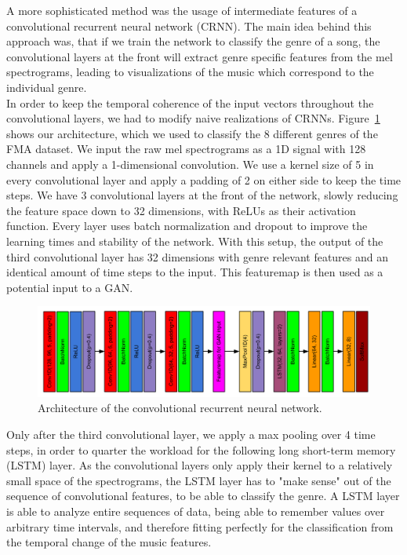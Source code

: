     A more sophisticated method was the usage of intermediate features of a convolutional recurrent neural network (CRNN).
    The main idea behind this approach was, that if we train the network to classify the genre of a song, the convolutional layers at the front will extract genre specific features from the mel spectrograms, leading to visualizations of the music which correspond to the individual genre.\\
    In order to keep the temporal coherence of the input vectors throughout the convolutional layers, we had to modify naive realizations of CRNNs.
    Figure~\ref{CRNN} shows our architecture, which we used to classify the 8 different genres of the FMA dataset.
    We input the raw mel spectrograms as a 1D signal with 128 channels and apply a 1-dimensional convolution. 
    We use a kernel size of 5 in every convolutional layer and apply a padding of 2 on either side to keep the time steps.
    We have 3 convolutional layers at the front of the network, slowly reducing the feature space down to 32 dimensions, with ReLUs as their activation function.
    Every layer uses batch normalization and dropout to improve the learning times and stability of the network.
    With this setup, the output of the third convolutional layer has 32 dimensions with genre relevant features and an identical amount of time steps to the input.
    This featuremap is then used as a potential input to a GAN.\\
    \begin{figure}[t]
        \centering
        \includegraphics[width=\textwidth]{images/CRNNmodel}
        \caption{Architecture of the convolutional recurrent neural network.}
        \label{CRNN}
    \end{figure}
    Only after the third convolutional layer, we apply a max pooling over 4 time steps, in order to quarter the workload for the following long short-term memory (LSTM) layer.
    As the convolutional layers only apply their kernel to a relatively small space of the spectrograms, the LSTM layer has to "make sense" out of the sequence of convolutional features, to be able to classify the genre.
    A LSTM layer is able to analyze entire sequences of data, being able to remember values over arbitrary time intervals, and therefore fitting perfectly for the classification from the temporal change of the music features.
